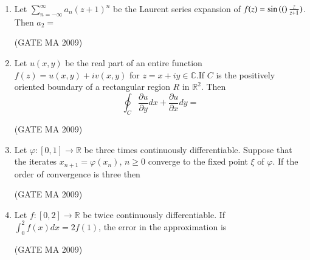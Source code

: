 \documentclass[journal,12pt,onecolumn]{IEEEtran}
\theoremstyle{remark}
\begin{document}
\begin{enumerate}[leftmargin=0pt, align=left, start=21]
\item Let $\sum_{n=-\infty}^\infty a_n (z+1)^n$ be the Laurent series expansion of $f(z)=\sin\left((\right)\frac{z}{z+1})$. Then $a_2=$
\begin{enumerate}
\end{enumerate}
\hfill (GATE MA 2009)

\item Let $u(x,y)$ be the real part of an entire function $f(z)=u(x,y)+iv(x,y)$ for $z=x+iy\in\mathbb{C}$.If $C$ is the positively oriented boundary of a rectangular region $R$ in $\mathbb{R}^2$. Then
$$
\oint_C \frac{\partial u}{\partial y}dx + \frac{\partial u}{\partial x}dy =
$$
\begin{enumerate}
\end{enumerate}
\hfill (GATE MA 2009)

\item Let $\varphi:[0,1]\to\mathbb{R}$ be three times continuously differentiable. Suppose that the iterates $x_{n+1} = \varphi(x_n)$, $n\geq0$ converge to the fixed point $\xi$ of $\varphi$. If the order of convergence is three then
\begin{enumerate}
\end{enumerate}
\hfill (GATE MA 2009)

\item Let $f:[0,2]\to\mathbb{R}$ be twice continuously differentiable. If $\int_0^2 f(x)dx = 2f(1)$, the error in the approximation is
\begin{enumerate}
\end{enumerate}
\hfill (GATE MA 2009)


\end{enumerate}
\end{document}
